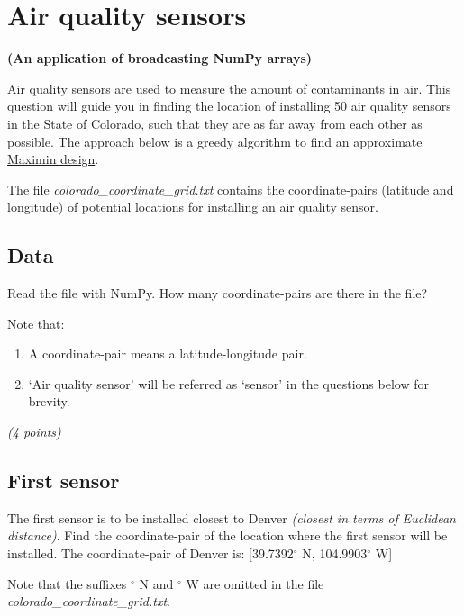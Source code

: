 \documentclass[
  letterpaper,
  DIV=11,
  numbers=noendperiod]{scrreprt}
\begin{document}
\hypertarget{air-quality-sensors}{%
\section{Air quality sensors}\label{air-quality-sensors}}

\textbf{(An application of broadcasting NumPy arrays)}

Air quality sensors are used to measure the amount of contaminants in
air. This question will guide you in finding the location of installing
50 air quality sensors in the State of Colorado, such that they are as
far away from each other as possible. The approach below is a greedy
algorithm to find an approximate
\href{https://www.sciencedirect.com/science/article/abs/pii/037837589090122B}{Maximin
design}.

The file \emph{colorado\_coordinate\_grid.txt} contains the
coordinate-pairs (latitude and longitude) of potential locations for
installing an air quality sensor.

\hypertarget{data}{%
\subsection{Data}\label{data}}

Read the file with NumPy. How many coordinate-pairs are there in the
file?

Note that:

\begin{enumerate}
\def\labelenumi{\arabic{enumi}.}
\item
  A coordinate-pair means a latitude-longitude pair.
\item
  `Air quality sensor' will be referred as `sensor' in the questions
  below for brevity.
\end{enumerate}

\emph{(4 points)}

\hypertarget{first-sensor}{%
\subsection{First sensor}\label{first-sensor}}

The first sensor is to be installed closest to Denver \emph{(closest in
terms of Euclidean distance)}. Find the coordinate-pair of the location
where the first sensor will be installed. The coordinate-pair of Denver
is: {[}39.7392\(^{\circ}\) N, 104.9903\(^{\circ}\) W{]}

Note that the suffixes \(^{\circ}\) N and \(^{\circ}\) W are omitted in
the file \emph{colorado\_coordinate\_grid.txt}.
\end{document}
